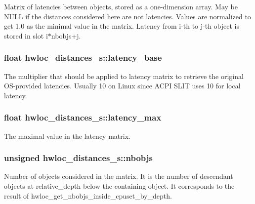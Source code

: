 Matrix of latencies between objects, stored as a one-\/dimension array. May be {\ttfamily NULL} if the distances considered here are not latencies. Values are normalized to get 1.0 as the minimal value in the matrix. Latency from i-\/th to j-\/th object is stored in slot i$\ast$nbobjs+j. 

\hypertarget{a00014_a204416418049a272bfb51602fc676342}{
\subsubsection[{latency\_\-base}]{\setlength{\rightskip}{0pt plus 5cm}float {\bf hwloc\_\-distances\_\-s::latency\_\-base}}}
\label{a00014_a204416418049a272bfb51602fc676342}


The multiplier that should be applied to latency matrix to retrieve the original OS-\/provided latencies. Usually 10 on Linux since ACPI SLIT uses 10 for local latency. 

\hypertarget{a00014_aab61bd1d1ae2e121bfe793c973ec829e}{
\subsubsection[{latency\_\-max}]{\setlength{\rightskip}{0pt plus 5cm}float {\bf hwloc\_\-distances\_\-s::latency\_\-max}}}
\label{a00014_aab61bd1d1ae2e121bfe793c973ec829e}


The maximal value in the latency matrix. 

\hypertarget{a00014_a4ca2af858cebbce7324ec49903d09474}{
\subsubsection[{nbobjs}]{\setlength{\rightskip}{0pt plus 5cm}unsigned {\bf hwloc\_\-distances\_\-s::nbobjs}}}
\label{a00014_a4ca2af858cebbce7324ec49903d09474}


Number of objects considered in the matrix. It is the number of descendant objects at {\ttfamily relative\_\-depth} below the containing object. It corresponds to the result of hwloc\_\-get\_\-nbobjs\_\-inside\_\-cpuset\_\-by\_\-depth. 

